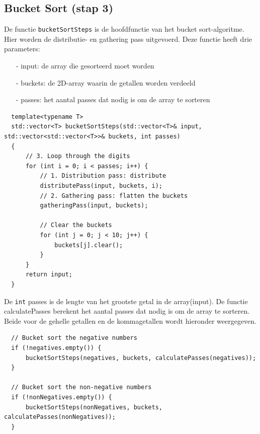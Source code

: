 \documentclass{article}
\begin{document}
\subsection{Bucket Sort (stap 3)}
De functie \texttt{bucketSortSteps} is de hoofdfunctie van het bucket sort-algoritme. Hier worden de distributie- en gathering pass uitgevoerd.
Deze functie heeft drie parameters:
\begin{itemize}
  \item[-] input: de array die gesorteerd moet worden
  \item[-] buckets: de 2D-array waarin de getallen worden verdeeld
  \item[-] passes: het aantal passes dat nodig is om de array te sorteren
\end{itemize}
\begin{lstlisting}
  template<typename T>
  std::vector<T> bucketSortSteps(std::vector<T>& input, std::vector<std::vector<T>>& buckets, int passes)
  {
      // 3. Loop through the digits
      for (int i = 0; i < passes; i++) {
          // 1. Distribution pass: distribute
          distributePass(input, buckets, i);
          // 2. Gathering pass: flatten the buckets
          gatheringPass(input, buckets);

          // Clear the buckets
          for (int j = 0; j < 10; j++) {
              buckets[j].clear();
          }
      }
      return input;
  }
\end{lstlisting}
De \texttt{int} passes is de lengte van het grootste getal in de array(input). 
De functie calculatePasses berekent het aantal passes dat nodig is om de array te sorteren. 
Beide voor de gehelle getallen en de kommagetallen wordt hieronder weergegeven.
\begin{lstlisting}
  // Bucket sort the negative numbers
  if (!negatives.empty()) {
      bucketSortSteps(negatives, buckets, calculatePasses(negatives));
  }
  
  // Bucket sort the non-negative numbers
  if (!nonNegatives.empty()) {
      bucketSortSteps(nonNegatives, buckets, calculatePasses(nonNegatives));
  }
\end{lstlisting}
\end{document}
